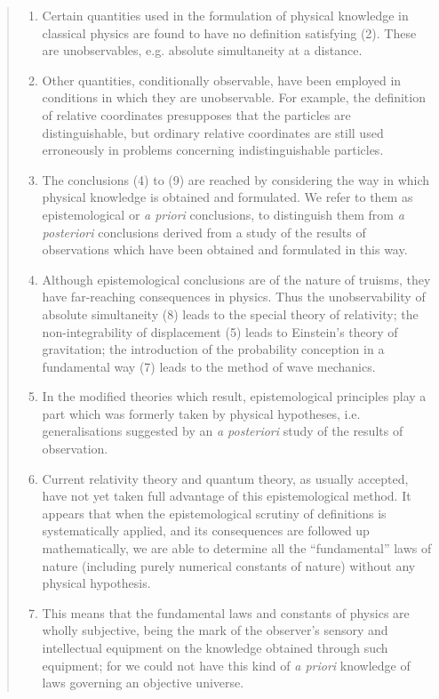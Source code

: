 \documentclass{article}
\begin{document}
\begin{quote}
\begin{enumerate}
        \item Certain quantities used in the formulation of physical  knowledge in classical physics are found to have no definition satisfying (2).  These are unobservables, e.g. absolute simultaneity at a distance.
        \item Other quantities, conditionally observable, have been employed in conditions in which they are unobservable.  For example, the definition of relative coordinates presupposes that the particles are distinguishable, but ordinary relative coordinates are still used erroneously in problems concerning indistinguishable particles.
        \item The conclusions (4) to (9) are reached by considering the way in which physical knowledge is obtained and formulated. We refer to them as epistemological or \emph{a priori} conclusions, to distinguish them from \emph{a posteriori} conclusions derived from a study of the results of observations which have been obtained and formulated in this way.
        \item Although epistemological conclusions are of the nature of truisms, they have far-reaching consequences in physics.  Thus the unobservability of absolute simultaneity (8) leads to the special theory of relativity; the non-integrability of displacement (5) leads to Einstein's theory of gravitation; the introduction of the probability conception in a fundamental way (7) leads to the method of wave mechanics.
        \item In the modified theories which result, epistemological principles play a part which was formerly taken by physical hypotheses, i.e. generalisations suggested by an \emph{a posteriori} study of the results of observation.
        \item Current relativity theory and quantum theory, as usually accepted, have not yet taken full advantage of this epistemological method.  It appears that when the epistemological scrutiny of definitions is systematically applied, and its consequences are followed up mathematically, we are able to determine all the ``fundamental'' laws of nature (including purely numerical constants of nature) without any physical hypothesis.
        \item This means that the fundamental laws and constants of physics are wholly subjective, being the mark of the observer's sensory and intellectual equipment on the knowledge obtained through such equipment; for we could not have this kind of \emph{a priori} knowledge of laws governing an objective universe.

\end{enumerate}
\end{quote}
\end{document}

